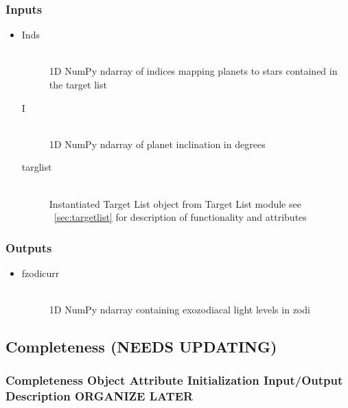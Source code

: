 \documentclass[cleanfoot]{asme2ej}
\begin{document}
\subsubsection*{Inputs}
\begin{itemize}
    \item 
    \begin{description}
        \item[Inds] \hfill \\
        1D NumPy ndarray of indices mapping planets to stars contained in the target list
        \item[I] \hfill \\
        1D NumPy ndarray of planet inclination in degrees
        \item[targlist] \hfill \\
        Instantiated Target List object from Target List module see ~\ref{sec:targetlist} for description of functionality and attributes
    \end{description}
\end{itemize}

\subsubsection*{Outputs}
\begin{itemize}
    \item 
    \begin{description}
        \item[fzodicurr] \hfill \\
        1D NumPy ndarray containing exozodiacal light levels in zodi
    \end{description}
\end{itemize}


\subsection{Completeness (NEEDS UPDATING)}\label{sec:completeness}

\subsubsection{Completeness Object Attribute Initialization Input/Output Description ORGANIZE LATER}
\end{document}
